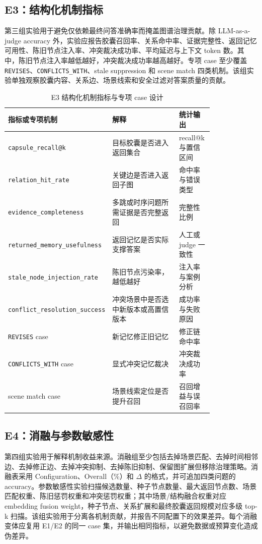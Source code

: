 \documentclass[a4paper,fleqn]{cas-sc}
\begin{document}
\begin{CJK*}{UTF8}{gbsn}
\subsection{E3：结构化机制指标}

第三组实验用于避免仅依赖最终问答准确率而掩盖图谱治理贡献。除 LLM-as-a-judge accuracy 外，实验应报告胶囊召回率、关系命中率、证据完整性、返回记忆可用性、陈旧节点注入率、冲突裁决成功率、平均延迟与上下文 token 数。其中，陈旧节点注入率越低越好，冲突裁决成功率越高越好。专项 case 至少覆盖 \texttt{REVISES}、\texttt{CONFLICTS\_WITH}、stale suppression 和 scene match 四类机制。该组实验单独观察胶囊内容、关系边、场景线索和安全过滤对答案质量的贡献。

\begin{table}[t]
\centering
\scriptsize
\caption{E3 结构化机制指标与专项 case 设计}
\label{tab:e3-metrics}
\setlength{\tabcolsep}{3pt}
\begin{tabular}{P{0.24\linewidth}P{0.40\linewidth}P{0.17\linewidth}}
\toprule
指标或专项机制 & 解释 & 统计输出 \\
\midrule
\texttt{capsule\_recall@k} & 目标胶囊是否进入返回集合 & recall@k 与置信区间 \\
\texttt{relation\_hit\_rate} & 关键边是否进入返回子图 & 命中率与错误类型 \\
\texttt{evidence\_completeness} & 多跳或时序问题所需证据是否完整返回 & 完整性比例 \\
\texttt{returned\_memory\_usefulness} & 返回记忆是否实际支撑答案 & 人工或 judge 一致性 \\
\texttt{stale\_node\_injection\_rate} & 陈旧节点污染率，越低越好 & 注入率与案例分析 \\
\texttt{conflict\_resolution\_success} & 冲突场景中是否选中新版本或高置信版本 & 成功率与失败原因 \\
\texttt{REVISES} case & 新记忆修正旧记忆 & 修正链命中率 \\
\texttt{CONFLICTS\_WITH} case & 显式冲突记忆裁决 & 冲突裁决成功率 \\
scene match case & 场景线索定位是否提升召回 & 召回增益与误召回率 \\
\bottomrule
\end{tabular}
\end{table}

\subsection{E4：消融与参数敏感性}

第四组实验用于解释机制收益来源。消融组至少包括去掉场景匹配、去掉时间相邻边、去掉修正边、去掉冲突抑制、去掉陈旧抑制、保留图扩展但移除治理策略。消融表采用 Configuration、Overall（\%）和 $\Delta$ 的格式，并可追加四类问题的 accuracy。参数敏感性实验扫描候选数量、种子节点数量、最大返回节点数、场景匹配权重、陈旧惩罚权重和冲突惩罚权重；其中场景/结构融合权重对应 embedding fusion weight，种子节点、关系扩展和最终胶囊返回规模对应多级 top-k 扫描。该组实验用于分离各机制贡献，并报告不同配置下的效果差异。每个消融变体应复用 E1/E2 的同一 case 集，并输出相同指标，以避免数据或预算变化造成伪差异。


\end{CJK*}
\end{document}
